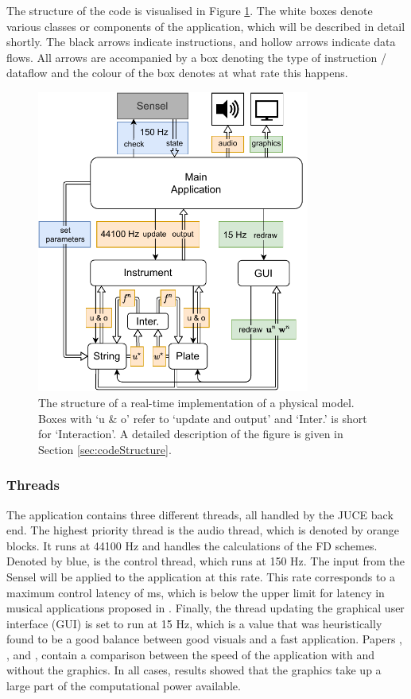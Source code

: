 The structure of the code is visualised in Figure \ref{fig:codeStructure}. The white boxes denote various classes or components of the application, which will be described in detail shortly. The black arrows indicate instructions, and hollow arrows indicate data flows. All arrows are accompanied by a box denoting the type of instruction / dataflow and the colour of the box denotes at what rate this happens.

\begin{figure}[t]
    \centering
    \includegraphics[width=0.8\textwidth]{figures/realtime/flowchart.pdf}
    \caption{The structure of a real-time implementation of a physical model. Boxes with `u \& o' refer to `update and output' and `Inter.' is short for `Interaction'. A detailed description of the figure is given in Section \ref{sec:codeStructure}.\label{fig:codeStructure}}
\end{figure}

\subsubsection{Threads}
The application contains three different threads, all handled by the JUCE back end. The highest priority thread is the audio thread, which is denoted by orange blocks. It runs at 44100 Hz and handles the calculations of the FD schemes. Denoted by blue, is the control thread, which runs at 150 Hz. The input from the Sensel will be applied to the application at this rate. This rate corresponds to a maximum control latency of  ms, which is below the upper limit for latency in musical applications proposed in \cite{Wessel2002}. Finally, the thread updating the graphical user interface (GUI) is set to run at 15 Hz, which is a value that was heuristically found to be a good balance between good visuals and a fast application. %
Papers \citeP[A], \citeP[C], and \citeP[H], contain a comparison between the speed of the application with and without the graphics. In all cases, results showed that the graphics take up a large part of the computational power available.


